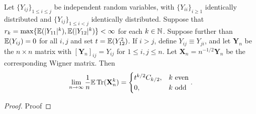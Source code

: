 \begin{proposition}
  \label{prop:matrix_moments_convergence}
  \notready
  Let $\{Y_{ij}\}_{1\le i\le j}$ be independent random variables, with $\{Y_{ii}\}_{i\ge 1}$ identically distributed and $\{Y_{ij}\}_{1\le i<j}$ identically distributed.  Suppose that $r_k = \max\{{\mathbb E}(|Y_{11}|^k),{\mathbb E}(|Y_{12}|^k)\} <\infty$ for each $k\in{\mathbb N}$.  Suppose further than ${\mathbb E}(Y_{ij})=0$ for all $i,j$ and set $t={\mathbb E}(Y_{12}^2)$.  If $i>j$, define $Y_{ij} \equiv Y_{ji}$, and let $\mathbf{Y}_n$ be the $n\times n$ matrix with $[\mathbf{Y}_n]_{ij} = Y_{ij}$ for $1\le i,j\le n$.  Let $\mathbf{X}_n = n^{-1/2}\mathbf{Y}_n$ be the corresponding Wigner matrix.  Then
\[
\lim_{n\to\infty} \frac{1}{n}{\mathbb E}\operatorname{Tr}(\mathbf{X}_n^k) = \begin{cases}
  t^{k/2}C_{k/2}, & k\text{ even} \\
  0, & k\text{ odd}
\end{cases}.
\]
\end{proposition}

\begin{proof}
\notready
Proof
\end{proof}

\iffalse

\begin{lemma}\label{lem:trace_smul}
  \mathlibok %
  \lean{Matrix.trace_smul}
  Let $R$ be a ring with a monoid action from $\alpha$ (i.e., $\alpha$ acts distributively on $R$).
  For any scalar $r \in \alpha$ and any square matrix $A$ over $R$, the trace of the scalar
  multiple $r \cdot A$ equals the scalar multiple of the trace of $A$, i.e.,
  \[ \text{tr}(r \cdot A) = r \cdot \text{tr}(A). \]
  \end{lemma}

  \begin{proof}\leanok %
  \end{proof}




















\fi

